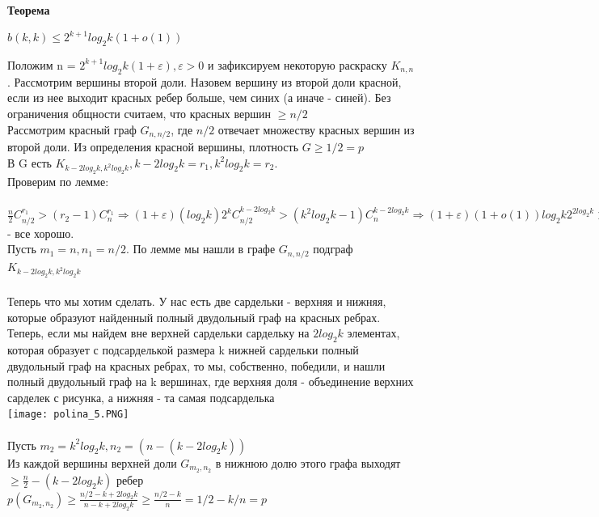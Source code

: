 \EndProof
\\
\textbf{Теорема}
\begin{center}
    $b(k,k) \leq 2
^{k+1} log_2 k(1 + o(1))$
\end{center}
\Proof Положим n = $2
^{k+1} log_2 k(1 + \varepsilon), \varepsilon > 0$ и зафиксируем некоторую раскраску $K_{n,n}$. Рассмотрим вершины второй доли. Назовем вершину из второй доли красной, если из нее выходит красных
ребер больше, чем синих (а иначе - синей). Без ограничения общности считаем, что красных вершин $\geq n/2$
\\
Рассмотрим красный граф $G_{n, n/2}$, где $n/2$ отвечает множеству красных вершин из второй доли. Из определения красной вершины, плотность $G  \geq 1/2 = p$
\\
В G есть $K_{k - 2log_2k, k^2log_2k}, k - 2log_2k = r_1, k^2log_2k = r_2$. 
\\
Проверим по лемме:
\\
\\
$\frac{n}{2}C_{n/2}^{r_1} > (r_2 - 1)C_{n}^{r_1} \Longrightarrow (1 +\varepsilon)(log_2k)2^kC_{n/2}^{k-2log_2k} > (k^2log_2k - 1)C_{n}^{k - 2log_2k} \Longrightarrow (1 + \varepsilon)(1 +o(1))log_2k2^{2log_2k} > (1 +o(1))k^2log_2k \Longrightarrow (1 + \varepsilon)(1 +o(1))k^2 > (1 +o(1))k^2log_2k \Longrightarrow (1 + \varepsilon)(1 +o(1)) > (1 +o(1))log_2k$ - все хорошо.
\\
Пусть $m_1 = n, n_1 = n/2$. По лемме мы нашли в графе $G_{n, n/2}$ подграф $K_{k - 2log_2k, k^2log_2k}$ 
\\
\\
Теперь что мы хотим сделать. У нас есть две сардельки - верхняя и нижняя, которые образуют найденный полный двудольный граф на красных ребрах. Теперь, если мы найдем вне верхней сардельки сардельку на $2log_2k$ элементах, которая образует с подсарделькой размера k нижней сардельки полный двудольный граф на красных ребрах, то мы, собственно, победили, и нашли полный двудольный граф на k вершинах, где верхняя доля - объединение верхних сарделек с рисунка, а нижняя - та самая подсарделька
\\
\texttt{[image: polina\_5.PNG]}
\\
\\
Пусть $m_2 = k^2log_2k, n_2 = (n - (k - 2log_2k))$
\\
Из каждой вершины верхней доли $G_{m_2, n_2}$ в нижнюю долю этого графа выходят $\geq \frac{n}{2} - (k-2log_2k)$ ребер\\
$p(G_{m_2,n_2}) \geq \frac{n/2 - k + 2log_2k}{n - k + 2log_2k} \geq \frac{n/2 - k}{n} = 1/2 - k/n = p$
